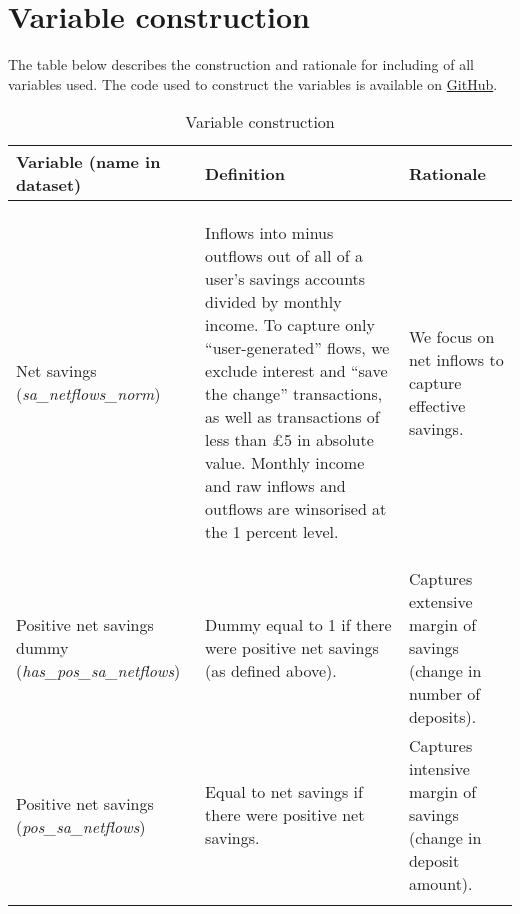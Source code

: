 
\section{Variable construction}%
\label{sec:variable_construction}

The table below describes the construction and rationale for including of all
variables used. The code used to construct the variables is available on
\href{https://github.com/fabiangunzinger/mdb_eval/blob/d094f8cd364f64bbe3d4e644abbff726af86de2f/src/data/aggregators.py}{GitHub}.

\begin{table}[htpb]
    \centering\scriptsize
    \caption{Variable construction}
    \label{tab:vars}
    \begin{tabularx}{\textwidth}{>{\raggedright\arraybackslash}X
        >{\raggedright\arraybackslash}X>{\raggedright\arraybackslash}X}
    \hline\hline
    Variable (name in dataset) & Definition  & Rationale \\
    \hline\\
    \multicolumn{3}{c}{\textbf{Primary outcome}}\\\\

    Net savings (\textit{sa\_netflows\_norm})&
    Inflows into minus outflows out of all of a user's savings accounts divided
    by monthly income. To capture only ``user-generated'' flows, we exclude
    interest and ``save the change'' transactions, as well as transactions of
    less than \pounds5 in absolute
    value. Monthly income and raw inflows and outflows are winsorised at the 1
    percent level.&
    We focus on net inflows to capture effective savings.\\\\

    \multicolumn{3}{c}{\textbf{Secondary outcomes}}\\\\

    Positive net savings dummy (\textit{has\_pos\_sa\_netflows})&
    Dummy equal to 1 if there were positive net savings (as defined above).&
    Captures extensive margin of savings (change in number of deposits).\\

    Positive net savings (\textit{pos\_sa\_netflows})&
    Equal to net savings if there were positive net savings.&
    Captures intensive margin of savings (change in deposit amount).\\\\


\end{tabularx}
\end{table}
